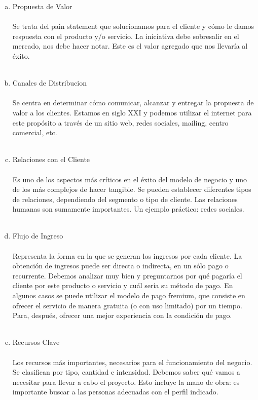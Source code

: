 \begin{enumerate}[1.]
\begin{enumerate}[a)]
			\item Propuesta de Valor \\
			\\
			Se trata del pain statement que solucionamos para el cliente y cómo le damos respuesta con el producto y/o servicio. La iniciativa debe sobresalir en el mercado, nos debe hacer notar. Este es el valor agregado que nos llevaría al éxito.\\
			\\
			\item Canales de Distribucion \\
			\\
			Se centra en determinar cómo comunicar, alcanzar y entregar la propuesta de valor a los clientes. Estamos en siglo XXI y podemos utilizar el internet para este propósito a través de un sitio web, redes sociales, mailing, centro comercial, etc.\\
			\\
			\item Relaciones con el Cliente \\
			\\
			Es uno de los aspectos más críticos en el éxito del modelo de negocio y uno de los más complejos de hacer tangible. Se pueden establecer diferentes tipos de relaciones, dependiendo del segmento o tipo de cliente. Las relaciones humanas son sumamente importantes. Un ejemplo práctico: redes sociales.\\
			\\
			\item Flujo de Ingreso \\
			\\
			Representa la forma en la que se generan los ingresos por cada cliente. La obtención de ingresos puede ser directa o indirecta, en un sólo pago o recurrente. Debemos analizar muy bien y preguntarnos por qué pagaría el cliente por este producto o servicio y cuál sería su método de pago. En algunos casos se puede utilizar el modelo de pago fremium, que consiste en ofrecer el servicio de manera gratuita (o con uso limitado) por un tiempo. Para, después, ofrecer una mejor experiencia con la condición de pago.\\
			\\
			\item Recursos Clave \\
			\\
			Los recursos más importantes, necesarios para el funcionamiento del negocio. Se clasifican por tipo, cantidad e intensidad. Debemos saber qué vamos a necesitar para llevar a cabo el proyecto. Esto incluye la mano de obra: es importante buscar a las personas adecuadas con el perfil indicado.\\

\end{enumerate}
\end{enumerate}
